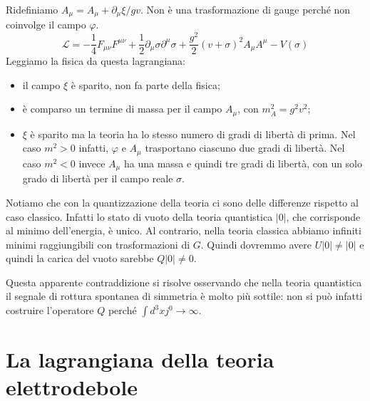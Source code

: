 \documentclass[italian,a4paper]{article}
\theoremstyle{definition}
\newcommand{\lagr}{\ensuremath{\mathscr{L}}}
\newcommand{\dimu}{\ensuremath{\partial_{\mu}}}
\begin{document}
Ridefiniamo $A_\mu = A_{\mu} + \dimu \xi / gv$. Non \`e una trasformazione
di gauge perch\'e non coinvolge il campo $\varphi$.
\begin{equation*}
    \lagr =  -\dfrac{1}{4}F_{\mu\nu}F^{\mu\nu}
    + \dfrac{1}{2}\partial_\mu \sigma \partial^\mu \sigma
    + \dfrac{g^2}{2}(v + \sigma)^2 A_{\mu}A^{\mu} - V(\sigma)
\end{equation*}
Leggiamo la fisica da questa lagrangiana:
\begin{itemize}
    \item il campo $\xi$ \`e sparito, non fa parte della fisica;
    \item \`e comparso un termine di massa per il campo $A_\mu$, con
        $m_A^2 = g^2 v^2$;
    \item $\xi$ \`e sparito ma la teoria ha lo stesso numero di gradi di
        libert\`a di prima. Nel caso $m^2 > 0$ infatti, $\varphi$ e
        $A_\mu$ trasportano ciascuno due gradi di libert\`a. Nel caso
        $m^2 < 0$ invece $A_\mu$ ha una massa e quindi tre gradi di
        libert\`a, con un solo grado di libert\`a per il campo reale
        $\sigma$.
\end{itemize}

Notiamo che con la quantizzazione della teoria ci sono delle differenze
rispetto al caso classico. Infatti lo stato di vuoto della teoria
quantistica $\vert 0 \rvert$, che corrisponde al minimo dell'energia, \`e
unico. Al contrario, nella teoria classica abbiamo infiniti minimi
raggiungibili con trasformazioni di $G$. Quindi dovremmo avere $U\vert 0
\rvert \neq \vert 0 \rvert$ e quindi la carica del vuoto sarebbe $Q \vert 0
\rvert \neq 0$.

Questa apparente contraddizione si risolve osservando che nella teoria
quantistica il segnale di rottura spontanea di simmetria \`e molto
pi\`u sottile: non si pu\`o infatti costruire l'operatore $Q$ perch\'e
$\int d^3 x j^0 \rightarrow \infty$.
\section{La lagrangiana della teoria elettrodebole}
\end{document}
